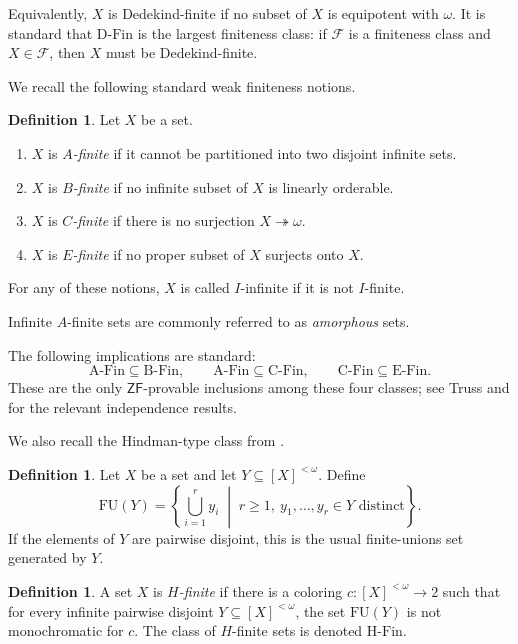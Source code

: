\documentclass[10pt,a4paper]{amsart}
\theoremstyle{definition}
\newtheorem{definition}[theorem]{Definition}
\newcommand{\ZF}{\mathsf{ZF}}
\newcommand{\DFin}{\mathrm{D\text{-}Fin}}
\newcommand{\BFin}{\mathrm{B\text{-}Fin}}
\newcommand{\CFin}{\mathrm{C\text{-}Fin}}
\newcommand{\EFin}{\mathrm{E\text{-}Fin}}
\newcommand{\AFin}{\mathrm{A\text{-}Fin}}
\newcommand{\HFin}{\mathrm{H\text{-}Fin}}
\newcommand{\FU}{\mathrm{FU}}
\begin{document}
Equivalently, \(X\) is Dedekind-finite if no subset of \(X\) is equipotent with \(\omega\).  It is standard that \(\DFin\) is the largest finiteness class: if \(\mathcal F\) is a finiteness class and \(X\in\mathcal F\), then \(X\) must be Dedekind-finite.

We recall the following standard weak finiteness notions.

\begin{definition}
Let \(X\) be a set.
\begin{enumerate}[label=(\arabic*)]
    \item \(X\) is \emph{\(A\)-finite} if it cannot be partitioned into two disjoint infinite sets.
    \item \(X\) is \emph{\(B\)-finite} if no infinite subset of \(X\) is linearly orderable.
    \item \(X\) is \emph{\(C\)-finite} if there is no surjection \(X\twoheadrightarrow \omega\).
    \item \(X\) is \emph{\(E\)-finite} if no proper subset of \(X\) surjects onto \(X\).
\end{enumerate}
For any of these notions, \(X\) is called \(I\)-infinite if it is not \(I\)-finite.
\end{definition}

Infinite \(A\)-finite sets are commonly referred to as \emph{amorphous} sets.

The following implications are standard:
\[
    \AFin\subseteq\BFin,
    \qquad
    \AFin\subseteq\CFin,
    \qquad
    \CFin\subseteq\EFin.
\]
These are the only \(\ZF\)-provable inclusions among these four classes; see Truss \cite{TrussFiniteness} and \cite{JechAC,Truss} for the relevant independence results.

We also recall the Hindman-type class from \cite{BCF}.

\begin{definition}
Let \(X\) be a set and let \(Y\subseteq [X]^{<\omega}\).  Define
\[
    \FU(Y)=\left\{\bigcup_{i=1}^r y_i \;\middle|\; r\geq 1,\ y_1,\dots,y_r\in Y\text{ distinct}\right\}.
\]
If the elements of \(Y\) are pairwise disjoint, this is the usual finite-unions set generated by \(Y\).
\end{definition}

\begin{definition}
A set \(X\) is \emph{\(H\)-finite} if there is a coloring \(c:[X]^{<\omega}\to 2\) such that for every infinite pairwise disjoint \(Y\subseteq [X]^{<\omega}\), the set \(\FU(Y)\) is not monochromatic for \(c\).  The class of \(H\)-finite sets is denoted \(\HFin\).
\end{definition}
\end{document}
